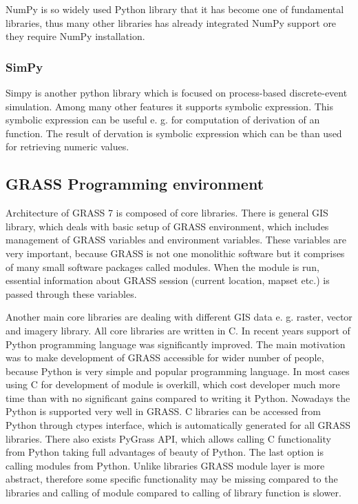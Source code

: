 \documentclass[a4paper,12pt]{report}
\begin{document}
NumPy is so widely used Python library that it has become one of fundamental libraries, thus many
other libraries has already integrated NumPy support ore they require NumPy installation.

\subsubsection{SimPy}

Simpy is another python library which is focused on process-based discrete-event simulation.
Among many other features it supports symbolic expression. This symbolic expression can be useful
e. g. for computation of derivation of an function. The result of dervation is symbolic expression which can 
be than used for retrieving numeric values. 

\subsection{GRASS Programming  environment}

Architecture of GRASS 7 is composed of core libraries. There is general GIS library, which 
deals with basic setup of GRASS environment, which includes management of
GRASS variables and environment variables. These variables are very important, because GRASS is not one monolithic software 
but it comprises of many small software packages called modules. When the module is run, essential information 
about GRASS session (current location, mapset etc.) is passed through these variables. 

Another main core libraries are dealing with different GIS data e. g. raster, vector and imagery library. 
All core libraries are written in C. In recent years support of Python programming language was significantly 
improved. The main motivation was to make development of GRASS accessible for wider number 
of people, because Python is very simple and popular programming language. In most cases using 
C for development of module is overkill, which cost developer much more time than 
with no significant gains compared to writing it Python. Nowadays the Python is supported very well in GRASS.
C libraries can be accessed from Python through ctypes interface, which is automatically generated 
for all GRASS libraries.  
There also exists 
PyGrass API, which allows calling C functionality from Python taking full advantages of beauty of Python.
The last option is calling modules from Python. Unlike libraries GRASS module layer is more abstract, 
therefore some specific functionality may be missing compared to the libraries and calling of module
compared to calling of library function is slower. 
\end{document}
